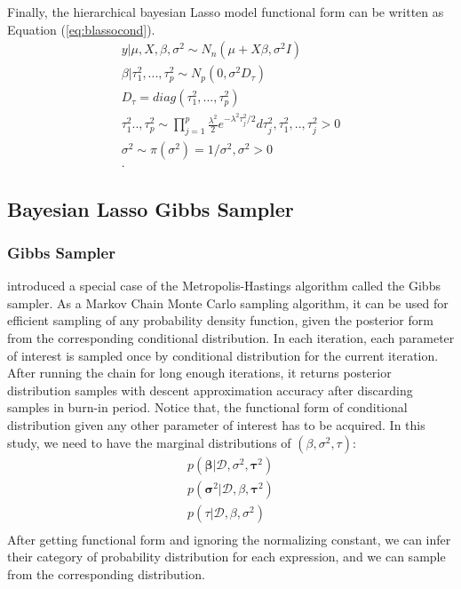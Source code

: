 Finally, the hierarchical bayesian Lasso model functional form can be written as Equation (\ref{eq:blassocond}).
\begin{equation}
	\label{eq:blassocond}
	\begin{multlined}
	y|\mu,X,\beta,\sigma^2 \sim N_n(\mu + X\beta,\sigma^2I)\\
	\beta|\tau_1^2,...,\tau_p^2 \sim N_p(0,\sigma^2D_{\tau})\\
	D_{\tau} = diag(\tau_1^2,...,\tau_p^2)\\
	\tau_1^2..,\tau_p^2 \sim \prod_{j=1}^p \frac{\lambda^2}{2} e^{-\lambda^2\tau_j^2/2}d\tau_j^2, \tau_1^2,..,\tau_j^2 > 0\\
	\sigma^2 \sim \pi(\sigma^2) = 1/\sigma^2, \sigma^2 > 0\\.
	\end{multlined}
\end{equation}

\subsection{Bayesian Lasso Gibbs Sampler}
\subsubsection{Gibbs Sampler}
\cite{4767596} introduced a special case of the Metropolis-Hastings algorithm called the Gibbs sampler. As a Markov Chain Monte Carlo sampling algorithm, it can be used for efficient sampling of any probability density function, given the posterior form from the corresponding conditional distribution. In each iteration, each parameter of interest is sampled once by conditional distribution for the current iteration. After running the chain for long enough iterations, it returns posterior distribution samples with descent approximation accuracy after discarding samples in burn-in period. Notice that, the functional form of conditional distribution given any other parameter of interest has to be acquired. In this study, we need to have the marginal distributions of  $(\beta,\sigma^2,\tau)$:
$$
	\begin{multlined}
	p(\mathbf{\beta}|\mathcal{D},\sigma^2,\mathbf{\tau}^2)\\
	p(\mathbf{\sigma}^2|\mathcal{D},\beta,\mathbf{\tau}^2)\\
	p(\tau|\mathcal{D},\beta,\sigma^2)\\
	\end{multlined}
$$
After getting functional form and ignoring the normalizing constant, we can infer their category of probability distribution for each expression, and we can sample from the corresponding distribution.

